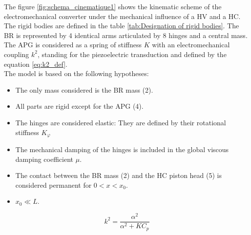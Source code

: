 \documentclass[3p,twocolumn,preprint]{elsarticle}
\begin{document}
The figure \ref{fig:schema_cinematique1} shows the kinematic scheme of the electromechanical converter under the mechanical influence of a HV and a HC. The rigid bodies are defined in the table \ref{tab:Designation of rigid bodies}. The BR is represented by 4 identical arms articulated by 8 hinges and a central mass. The APG is considered as a spring of stiffness $K$ with an electromechanical coupling $k^2$, standing for the piezoelectric transduction and defined by the equation \ref{eq:k2_def}.\\
The model is based on the following hypotheses:
\begin{itemize}
	\item The only mass considered is the BR mass (2).
	\item All parts are rigid except for the APG (4).
	\item The hinges are considered elastic: They are defined by their rotational stiffness $K_{\varphi}$
	\item The mechanical damping of the hinges is included in the global viscous damping coefficient $\mu$.
	\item The contact between the BR mass (2) and the HC piston head (5) is considered permanent for $0 < x < x_0$.
	\item \mbox{$x_0 \ll L$}. 
\end{itemize}
\begin{equation}
	k^2 = \dfrac{\alpha^2}{\alpha^2 +  K C_p}
	\label{eq:k2_def}
\end{equation}
\begin{table}[!htbp]
\centering
{}
\caption{Definition of figure \ref{fig:schema_cinematique1} bodies}
\label{tab:Designation of rigid bodies}
\end{table}
\end{document}

